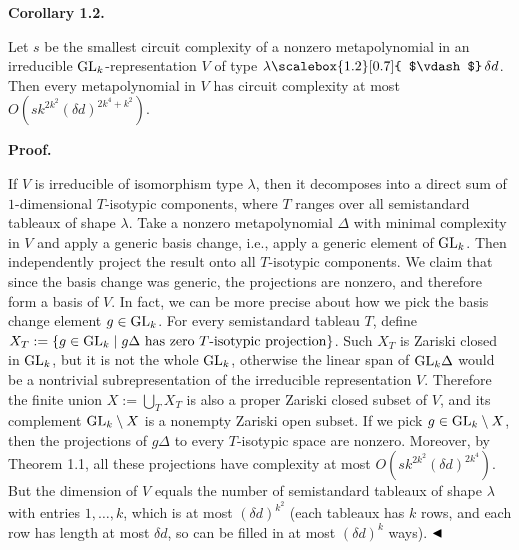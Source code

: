 \documentclass[10pt,a4paper]{article}
\begin{document}
\par\medskip\noindent\textbf{Corollary 1.2.}\par



Let $s$ be the smallest circuit complexity of a nonzero metapolynomial in an irreducible $\textnormal{GL}_{k}$-representation $V$ of type $\lambda\mathchoice{\scalebox{1.2}[0.7]{ $\vdash$}\,}{\scalebox{1.2}[0.7]{ $\vdash$}\,}{\scalebox{0.7}{\scalebox{1.2}[0.7]{$\vdash$}}\,}{\scalebox{0.5}{\scalebox{1.2}[0.7]{$\vdash$}}\,}\delta d$.
Then every metapolynomial in $V$ has circuit complexity at most
$O(sk^{2k^{2}}(\delta d)^{2k^{4}+k^{2}})$.






\par\medskip\noindent\textbf{Proof.}\par




If $V$ is irreducible of isomorphism type $\lambda$, then it decomposes into a direct sum of $1$-dimensional $T$-isotypic components, where $T$ ranges over all semistandard tableaux of shape $\lambda$.
Take a nonzero metapolynomial $\Delta$ with minimal complexity in $V$ and apply a generic basis change, i.e., apply a generic element of $\textnormal{GL}_{k}$.
Then independently project the result onto all $T$-isotypic components.
We claim that since the basis change was generic, the projections are nonzero, and therefore form a basis of $V$.
In fact, we can be more precise about how we pick the basis change element $g\in\textnormal{GL}_{k}$.
For every semistandard tableau $T$, define $X_{T}:=\{g\in\textnormal{GL}_{k}\mid g\Delta\text{ has zero $T$-isotypic projection}\}$.
Such $X_{T}$ is Zariski closed in $\textnormal{GL}_{k}$, but it is not the whole $\textnormal{GL}_{k}$, otherwise the linear span of $\textnormal{GL}_{k}\Delta$ would be a nontrivial subrepresentation of the irreducible representation $V$.
Therefore the finite union $X:=\bigcup_{T}X_{T}$ is also a proper Zariski closed subset of $V$, and its complement $\textnormal{GL}_{k}\setminus X$ is a nonempty Zariski open subset.
If we pick $g\in\textnormal{GL}_{k}\setminus X$, then the projections of $g\Delta$ to every $T$-isotypic space are nonzero.
Moreover, by Theorem 1.1, all these projections have complexity at most $O(sk^{2k^{2}}(\delta d)^{2k^{4}})$.
But the dimension of $V$ equals the number of semistandard tableaux of shape $\lambda$ with entries $1,\ldots,k$, which is at most $(\delta d)^{k^{2}}$ (each tableaux has $k$ rows, and each row has length at most $\delta d$, so can be filled in at most $(\delta d)^{k}$ ways).
$\hfill\blacktriangleleft$
\end{document}
